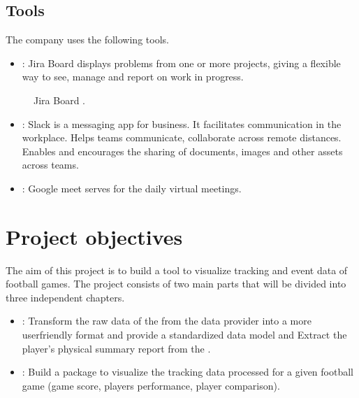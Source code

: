 \documentclass[letterpaper,10pt,english]{jupyterBook}
\begin{document}
\subsection{Tools}
\label{\detokenize{Introduction/introduction:tools}}
\sphinxAtStartPar
The company uses the following tools.
\begin{itemize}
\item {} 
\sphinxAtStartPar
{}: Jira Board displays problems from one or more projects, giving a flexible way to see, manage and report on work in progress.

\end{itemize}

\begin{figure}[htbp]
\centering
\capstart

\noindent{}
\caption{Jira Board .}\label{\detokenize{Introduction/introduction:jira-fig}}\end{figure}
\begin{itemize}
\item {} 
\sphinxAtStartPar
{}: Slack is a messaging app for business. It facilitates communication in the workplace. Helps teams communicate, collaborate across remote distances. Enables and encourages the sharing of documents, images and other assets across teams.

\item {} 
\sphinxAtStartPar
{}: Google meet serves for the daily virtual meetings.

\end{itemize}


\section{Project objectives}
\label{\detokenize{Introduction/introduction:project-objectives}}
\sphinxAtStartPar
The aim of this project is to build a tool to visualize tracking and event data of football games.
The project consists of two main parts that will be divided into three independent chapters.
\begin{itemize}
\item {} 
\sphinxAtStartPar
{} : Transform the raw data of the  from the data provider into a more user\sphinxhyphen{}friendly format and provide a standardized data model and Extract the player’s physical summary report from the .

\item {} 
\sphinxAtStartPar
{} : Build a package to visualize the tracking data processed for a given football game (game score, players performance, player comparison).

\end{itemize}
\end{document}
